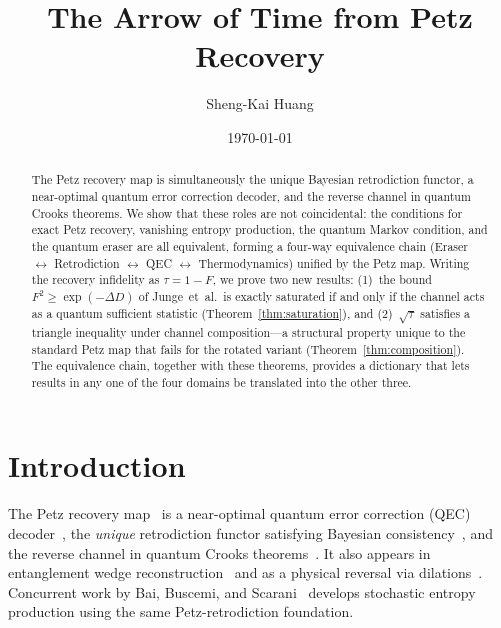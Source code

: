 \documentclass[prl,twocolumn,superscriptaddress,longbibliography,floatfix]{revtex4-2}
\newcommand{\tauasym}{\tau}
\begin{document}
\title{The Arrow of Time from Petz Recovery}

\author{Sheng-Kai Huang}

\date{\today}

\begin{abstract}
The Petz recovery map is simultaneously the unique
Bayesian retrodiction functor, a near-optimal quantum error
correction decoder, and the reverse channel in quantum Crooks
theorems.  We show that these roles are not coincidental:
the conditions for exact Petz recovery, vanishing entropy
production, the quantum Markov condition, and the quantum eraser
are all equivalent, forming a four-way equivalence chain
(Eraser $\leftrightarrow$ Retrodiction $\leftrightarrow$ QEC
$\leftrightarrow$ Thermodynamics) unified by the Petz map.
Writing the recovery infidelity as $\tauasym = 1 - F$,
we prove two new results:
(1)~the bound $F^2 \geq \exp(-\Delta D)$ of Junge~et~al.\
is exactly saturated if and only if the channel acts as a
quantum sufficient statistic (Theorem~\ref{thm:saturation}), and
(2)~$\sqrt{\tauasym}$ satisfies a triangle inequality under
channel composition---a structural property unique to the
standard Petz map that fails for the rotated variant
(Theorem~\ref{thm:composition}).
The equivalence chain, together with these theorems, provides
a dictionary that lets results in any one of the four
domains be translated into the other three.
\end{abstract}

\maketitle

\section{Introduction}
\label{sec:intro}

The Petz recovery map~\cite{Petz1986,Petz1988} is a near-optimal
quantum error correction (QEC) decoder~\cite{Barnum2002}, the
\emph{unique} retrodiction functor satisfying Bayesian
consistency~\cite{Parzygnat2023}, and the reverse channel in
quantum Crooks theorems~\cite{Crooks1999,Kwon2019}.  It also appears in
entanglement wedge reconstruction~\cite{Chen2020} and as a
physical reversal via dilations~\cite{Aw2024}.
Concurrent work by Bai, Buscemi, and
Scarani~\cite{Buscemi2024} develops stochastic entropy
production using the same Petz-retrodiction foundation.
\end{document}
